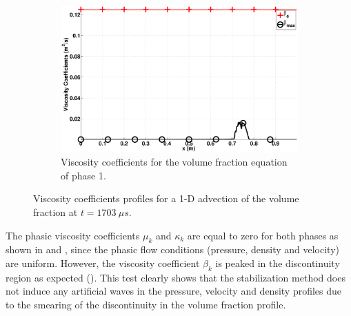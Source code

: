 \documentclass[preprint,10pt]{elsarticle}
\begin{document}
\begin{figure}[H]
        \begin{subfigure}[b]{0.495\textwidth}
                \centering
                \includegraphics[width=\textwidth]{figures/liquid_beta.eps}
                \caption{Viscosity coefficients for the volume fraction equation of phase 1.}
                \label{fig:adv-vf-beta}
        \end{subfigure}        
        \caption{Viscosity coefficients profiles for a 1-D advection of the volume fraction at $t=1703 \ \mu s$.}\label{adv-vf-visc}
\end{figure}
%
The phasic viscosity coefficients $\mu_k$ and $\kappa_k$ are equal to zero for both phases as shown in  and , since the phasic flow conditions (pressure, density and velocity) are uniform. However, the viscosity coefficient $\beta_k$ is peaked in the discontinuity region as expected (). This test clearly shows that the stabilization method does not induce any artificial waves in the pressure, velocity and density profiles due to the smearing of the discontinuity in the volume fraction profile. 
\end{document}
